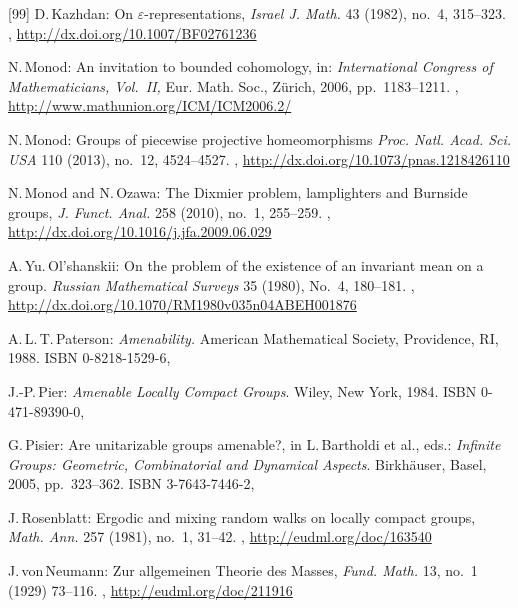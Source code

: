 \begin{references}{[99]}
D.\,Kazhdan:
On $\varepsilon$-representations, 
\emph{Israel J. Math.} 43 (1982), no.~4, 315--323.
,
\url{http://dx.doi.org/10.1007/BF02761236}

N.\,Monod:
An invitation to bounded cohomology,
in: \emph{International Congress of Mathematicians, Vol.~II,}
Eur. Math. Soc., Z\"urich, 2006, pp.~1183--1211.
,
\maynewline
\url{http://www.mathunion.org/ICM/ICM2006.2/}

N.\,Monod:
Groups of piecewise projective homeomorphisms
\emph{Proc. Natl. Acad. Sci. USA} 110 (2013), no.~12, 4524--4527. 
, 
\maynewline
\url{http://dx.doi.org/10.1073/pnas.1218426110}

N.\,Monod and N.\,Ozawa:
The Dixmier problem, lamplighters and Burnside groups,
\emph{J. Funct. Anal.} 258 (2010), no.~1, 255--259. 
,
\maynewline
\url{http://dx.doi.org/10.1016/j.jfa.2009.06.029}

A.\,Yu.\,Ol'shanskii:
On the problem of the existence of an invariant mean on a group.
\emph{Russian Mathematical Surveys} 35 (1980), No.~4, 180--181.
,
\maynewline
\url{http://dx.doi.org/10.1070/RM1980v035n04ABEH001876}

A.\,L.\,T.\,Paterson:
\emph{Amenability.}
American Mathematical Society, Providence, RI, 1988. 
ISBN 0-8218-1529-6,

J.-P.\,Pier:
\emph{Amenable Locally Compact Groups}.
Wiley, New York, 1984.
ISBN 0-471-89390-0,

G.\,Pisier:
Are unitarizable groups amenable?,
in  
L.\,Bartholdi et al., eds.:
\emph{Infinite Groups: Geometric, Combinatorial and Dynamical Aspects}.
Birkh\"auser, Basel, 2005, pp.~323--362.
ISBN 3-7643-7446-2,

J.\,Rosenblatt:
Ergodic and mixing random walks on locally compact groups,
\emph{Math. Ann.} 257 (1981), no.~1, 31--42. 
,
\maynewline
\url{http://eudml.org/doc/163540}

J.\,von\,Neumann:
Zur allgemeinen Theorie des Masses,
\emph{Fund. Math.} 13, no.~1 (1929) 73--116.
,
\maynewline 
\url{http://eudml.org/doc/211916}


\end{references}
